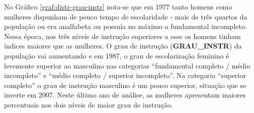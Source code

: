 \newpage
No Gráfico \ref{graf:distr-grau-instr} nota-se que em 1977 tanto homens como mulheres dispunham de pouco tempo de escolaridade - mais de três quartos da população ou era analfabeta ou possuía no máximo o fundamental incompleto. Nessa época, nos três níveis de instrução superiores a esse os homens tinham índices maiores que as mulheres. O grau de instrução (\textbf{GRAU_INSTR}) da população vai aumentando e em 1987, o grau de escolarização feminino é levemente superior ao masculino nas categorias ``fundamental completo / médio incompleto'' e ``médio completo / superior incompleto''. Na categoria ``superior completo'' o grau de instrução masculino é um pouco superior, situação que se inverte em 2007. Neste último ano de análise, as mulheres apresentam maiores percentuais nos dois níveis de maior grau de instrução.

%

